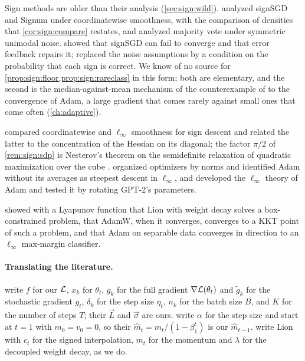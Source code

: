 \begin{refsection}
\notesandrefs

Sign methods are older than their analysis (\cref{sec:sign:wild}). \Textcite{BernsteinEtAl2018} analyzed signSGD and Signum under coordinatewise smoothness, with the comparison of densities that \cref{cor:sign:compare} restates, and \textcite{BernsteinEtAl2019} analyzed majority vote under symmetric unimodal noise. \Textcite{KarimireddyEtAl2019} showed that signSGD can fail to converge and that error feedback repairs it; \textcite{SafaryanRichtarik2021} replaced the noise assumptions by a condition on the probability that each sign is correct. We know of no source for \cref{prop:sign:floor,prop:sign:rareclass} in this form; both are elementary, and the second is the median-against-mean mechanism of the counterexample of \textcite{ReddiKaleKumar2018} to the convergence of Adam, a large gradient that comes rarely against small ones that come often (\cref{ch:adaptive}).

\Textcite{BallesPedregosaLeRoux2020} compared coordinatewise and $\ell_\infty$ smoothness for sign descent and related the latter to the concentration of the Hessian on its diagonal; the factor $\pi/2$ of \cref{rem:sign:sdp} is Nesterov's theorem on the semidefinite relaxation of quadratic maximization over the cube \parencite{Nesterov1998}. \Textcite{BernsteinNewhouse2024} organized optimizers by norms and identified Adam without its averages as steepest descent in $\ell_\infty$, and \textcite{XieMohamadiLi2025} developed the $\ell_\infty$ theory of Adam and tested it by rotating GPT-2's parameters.

\Textcite{ChenLiuLiangLiu2024} showed with a Lyapunov function that Lion with weight decay solves a box-constrained problem, \textcite{XieLi2024} that AdamW, when it converges, converges to a KKT point of such a problem, and \textcite{ZhangZouCao2024} that Adam on separable data converges in direction to an $\ell_\infty$ max-margin classifier.

\paragraph{Translating the literature.} \Textcite{BernsteinEtAl2018} write $f$ for our $\mathcal{L}$, $x_k$ for $\theta_t$, $g_k$ for the full gradient $\nabla\mathcal{L}(\theta_t)$ and $\tilde g_k$ for the stochastic gradient $g_t$, $\delta_k$ for the step size $\eta_t$, $n_k$ for the batch size $B$, and $K$ for the number of steps $T$; their $\vec L$ and $\vec\sigma$ are ours. \Textcite{KingmaBa2015} write $\alpha$ for the step size and start at $t=1$ with $m_0=v_0=0$, so their $\hat m_t=m_t/(1-\beta_1^t)$ is our $\hat m_{t-1}$. \Textcite{ChenEtAl2023} write Lion with $c_t$ for the signed interpolation, $m_t$ for the momentum and $\lambda$ for the decoupled weight decay, as we do.

\printchapterbib
\end{refsection}
